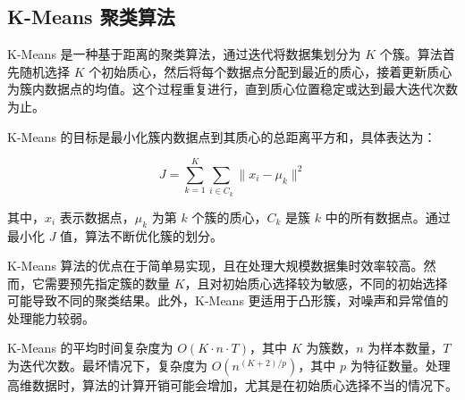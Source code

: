 \documentclass{article}
\begin{document}
\subsection{K-Means 聚类算法}

K-Means 是一种基于距离的聚类算法，通过迭代将数据集划分为 \(K\) 个簇。算法首先随机选择 \(K\) 个初始质心，然后将每个数据点分配到最近的质心，接着更新质心为簇内数据点的均值。这个过程重复进行，直到质心位置稳定或达到最大迭代次数为止。

K-Means 的目标是最小化簇内数据点到其质心的总距离平方和，具体表达为：

\[
J = \sum_{k=1}^{K} \sum_{i \in C_k} \| x_i - \mu_k \|^2
\]

其中，\(x_i\) 表示数据点，\(\mu_k\) 为第 \(k\) 个簇的质心，\(C_k\) 是簇 \(k\) 中的所有数据点。通过最小化 \(J\) 值，算法不断优化簇的划分。

K-Means 算法的优点在于简单易实现，且在处理大规模数据集时效率较高。然而，它需要预先指定簇的数量 \(K\)，且对初始质心选择较为敏感，不同的初始选择可能导致不同的聚类结果。此外，K-Means 更适用于凸形簇，对噪声和异常值的处理能力较弱。

K-Means 的平均时间复杂度为 \(O(K \cdot n \cdot T)\)，其中 \(K\) 为簇数，\(n\) 为样本数量，\(T\) 为迭代次数。最坏情况下，复杂度为 \(O(n^{(K+2)/p})\)，其中 \(p\) 为特征数量。处理高维数据时，算法的计算开销可能会增加，尤其是在初始质心选择不当的情况下。
\end{document}
